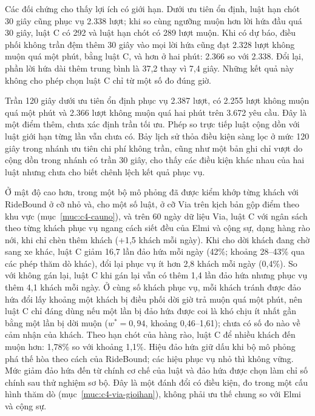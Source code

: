 Các đối chứng cho thấy lợi ích có giới hạn. Dưới ưu tiên ổn định, luật hạn chót 30 giây cũng phục vụ 2.338
lượt; khi so cùng ngưỡng muộn hơn lời hứa đầu quá 30 giây, luật C có 292 và luật hạn chót có 289 lượt muộn.
Khi có dự báo, điều phối không trần đệm thêm 30 giây vào mọi lời hứa cũng đạt 2.328 lượt không muộn quá một
phút, bằng luật C, và hơn ở hai phút: 2.366 so với 2.338. Đổi lại, phần lời hứa dài thêm trung bình là 37,2
thay vì 7,4 giây. Những kết quả này không cho phép chọn luật C chỉ từ một số đo đúng giờ.

Trần 120 giây dưới ưu tiên ổn định phục vụ 2.387 lượt, có 2.255 lượt không muộn quá một phút và 2.366 lượt
không muộn quá hai phút trên 3.672 yêu cầu. Đây là một điểm thêm, chưa xác định trần tối ưu. Phép so trực
tiếp luật cộng dồn với luật giới hạn từng lần vẫn chưa có. Bảy lịch sử thỏa điều kiện sàng lọc ở mức 120 giây
trong nhánh ưu tiên chi phí không trần, cũng như một bản ghi chỉ vượt do cộng dồn trong nhánh có trần 30
giây, cho thấy các điều kiện khác nhau của hai luật nhưng chưa cho biết chênh lệch kết quả phục vụ.

Ở mật độ cao hơn, trong một bộ mô phỏng đã được kiểm khớp từng khách với RideBound ở cỡ nhỏ và, cho một số luật, ở cỡ Via
trên kịch bản gộp điểm theo khu vực (mục~\ref{muc:c4-cauno}), và trên 60 ngày dữ liệu Via, luật C với ngân sách theo
từng khách phục vụ ngang cách siết đều của Elmi và cộng sự, dạng hàng rào nới, khi chỉ chèn thêm khách (+1,5 khách mỗi
ngày). Khi cho dời khách đang chờ sang xe khác, luật C giảm 16,7 lần đảo hứa mỗi ngày (42\%; khoảng 28--43\% qua các phép
thăm dò khác), đổi lại phục vụ ít hơn 2,8 khách mỗi ngày (0,4\%). So với không gán lại, luật C khi gán lại vẫn có thêm 1,4
lần đảo hứa nhưng phục vụ thêm 4,1 khách mỗi ngày. Ở cùng số khách phục vụ, mỗi khách tránh được đảo hứa đổi lấy khoảng một
khách bị điều phối dời giờ trả muộn quá một phút, nên luật C chỉ đáng dùng nếu một lần bị đảo hứa được coi là khó chịu ít
nhất gần bằng một lần bị dời muộn ($w^* = 0{,}94$, khoảng 0,46--1,61); chưa có số đo nào về cảm nhận của khách. Theo hạn chót
của hàng rào, luật C để nhiều khách đến muộn hơn: 1,78\% so với khoảng 1,1\%. Hiệu đảo hứa giữ dấu khi bộ mô phỏng phá thế
hòa theo cách của RideBound; các hiệu phục vụ nhỏ thì không vững. Mức giảm đảo hứa đến từ chính cơ chế của luật và đảo hứa
được chọn làm chỉ số chính sau thử nghiệm sơ bộ. Đây là một đánh đổi có điều kiện, đo trong một cấu hình thăm dò
(mục~\ref{muc:c4-via-gioihan}), không phải ưu thế chung so với Elmi và cộng sự.

